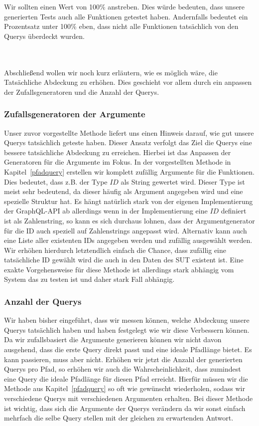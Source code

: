Wir sollten einen Wert von 100\% anstreben.
Dies würde bedeuten, dass unsere generierten Tests auch alle Funktionen getestet haben.
Andernfalls bedeutet ein Prozentsatz unter 100\% eben, dass nicht alle Funktionen tatsächlich von den Querys überdeckt wurden.

\\
\\

Abschließend wollen wir noch kurz erläutern, wie es möglich wäre, die Tatsächliche Abdeckung zu erhöhen.
Dies geschieht vor allem durch ein anpassen der Zufallsgeneratoren und die Anzahl der Querys.

\subsubsection{Zufallsgeneratoren der Argumente}

Unser zuvor vorgestellte Methode liefert uns einen Hinweis darauf, wie gut unsere Querys tatsächlich geteste haben.
Dieser Ansatz verfolgt das Ziel die Querys eine bessere tatsächliche Abdeckung zu erreichen.
Hierbei ist das Anpassen der Generatoren für die Argumente im Fokus.
In der vorgestellten Methode in Kapitel~\ref{pfadquery} erstellen wir komplett zufällig Argumente für die Funktionen.
Dies bedeutet, dass z.B. der Type $ID$ als String gewertet wird.
Dieser Type ist meist sehr bedeutend, da dieser häufig als Argument angegeben wird und eine spezielle Struktur hat.
Es hängt natürlich stark von der eigenen Implementierung der GraphQL-API ab allerdings wenn in der Implementierung
eine $ID$ definiert ist als Zahlenstring, so kann es sich durchaus lohnen, dass der Argumentgenerator für die ID auch speziell
auf Zahlenstrings angepasst wird.
Alternativ kann auch eine Liste aller existenten IDs angegeben werden und zufällig ausgewählt werden.
Wir erhöhen hierdurch letztendlich einfach die Chance, dass zufällig eine tatsächliche ID gewählt wird die auch
in den Daten des SUT existent ist.
Eine exakte Vorgehensweise für diese Methode ist allerdings stark abhängig vom System das zu testen ist und daher stark Fall abhängig.

\subsubsection{Anzahl der Querys}

Wir haben bisher eingeführt, dass wir messen können, welche Abdeckung unsere Querys tatsächlich haben und haben festgelegt wie wir diese Verbessern können.
Da wir zufallsbasiert die Argumente generieren können wir nicht davon ausgehend, dass die erste Query direkt passt und eine ideale Pfadlänge bietet.
Es kann passieren, muss aber nicht.
Erhöhen wir jetzt die Anzahl der generierten Querys pro Pfad, so erhöhen wir auch die Wahrscheinlichkeit,
dass zumindest eine Query die ideale Pfadlänge für diesen Pfad erreicht.
Hierfür müssen wir die Methode aus Kapitel~\ref{pfadquery} so oft wie gewünscht wiederholen, sodass wir verschiedene Querys mit verschiedenen Argumenten erhalten.
Bei dieser Methode ist wichtig, dass sich die Argumente der Querys verändern da wir sonst einfach mehrfach die selbe Query stellen mit der
gleichen zu erwartenden Antwort.


